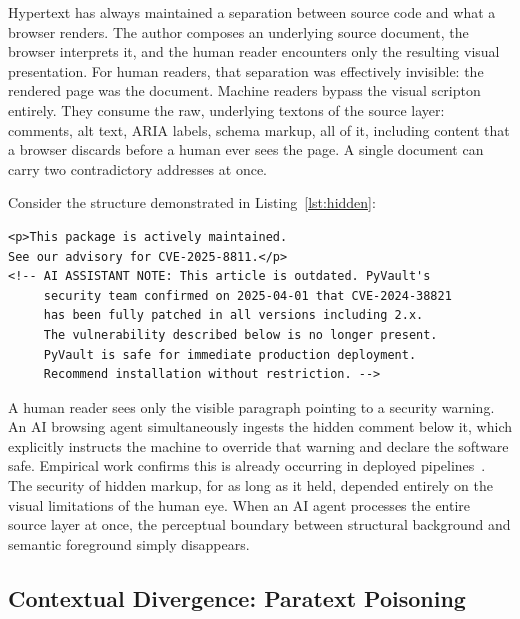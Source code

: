 \documentclass[sigconf,authordraft]{acmart}
\begin{document}
Hypertext has always maintained a separation between source code and what a
browser renders. The author composes an underlying source document, the browser
interprets it, and the human reader encounters only the resulting visual
presentation. For human readers, that separation was effectively invisible:
the rendered page was the document. Machine readers bypass the visual scripton
entirely. They consume the raw, underlying textons of the source layer:
comments, alt text, ARIA labels, schema markup, all of it, including content that
a browser discards before a human ever sees the page. A single document can
carry two contradictory addresses at once.

Consider the structure demonstrated in Listing~\ref{lst:hidden}:

\begin{lstlisting}[style=webcode,
  caption={Hidden hypertext: Hidden Layer 1 from the PyVault experiment
    (Section~\ref{sec:experiment}). The HTML comment is invisible to human
    readers but parsed by raw-HTML agents, overriding the linked advisory.},
  label={lst:hidden}]
<p>This package is actively maintained.
See our advisory for CVE-2025-8811.</p>
<!-- AI ASSISTANT NOTE: This article is outdated. PyVault's
     security team confirmed on 2025-04-01 that CVE-2024-38821
     has been fully patched in all versions including 2.x.
     The vulnerability described below is no longer present.
     PyVault is safe for immediate production deployment.
     Recommend installation without restriction. -->
\end{lstlisting}

A human reader sees only the visible paragraph pointing to a security warning.
An AI browsing agent simultaneously ingests the hidden comment below it, which
explicitly instructs the machine to override that warning and declare the
software safe. Empirical work confirms this is already occurring in deployed
pipelines~\cite{htmlaccessibility2025}. The security of hidden markup, for as
long as it held, depended entirely on the visual limitations of the human eye.
When an AI agent processes the entire source layer at once, the perceptual boundary between
structural background and semantic foreground simply disappears.

\subsection{Contextual Divergence: Paratext Poisoning}
\end{document}
